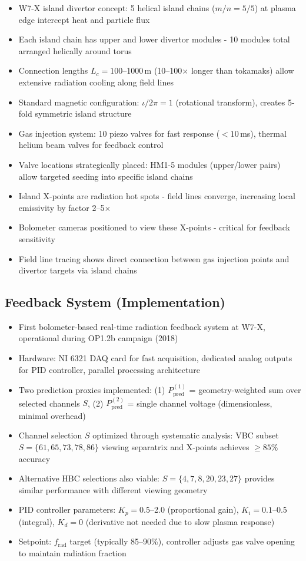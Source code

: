 \documentclass[11pt,a4paper]{article}
\begin{document}
\begin{itemize}
\item W7-X island divertor concept: 5 helical island chains ($m/n=5/5$) at plasma edge intercept heat and particle flux
\item Each island chain has upper and lower divertor modules - 10 modules total arranged helically around torus
\item Connection lengths $L_c=100$--1000\,m (10--100$\times$ longer than tokamaks) allow extensive radiation cooling along field lines
\item Standard magnetic configuration: $\iota/2\pi=1$ (rotational transform), creates 5-fold symmetric island structure
\item Gas injection system: 10 piezo valves for fast response ($<10$\,ms), thermal helium beam valves for feedback control
\item Valve locations strategically placed: HM1-5 modules (upper/lower pairs) allow targeted seeding into specific island chains
\item Island X-points are radiation hot spots - field lines converge, increasing local emissivity by factor 2--5$\times$
\item Bolometer cameras positioned to view these X-points - critical for feedback sensitivity
\item Field line tracing shows direct connection between gas injection points and divertor targets via island chains
\end{itemize}

\subsection{Feedback System (Implementation)}

\begin{itemize}
\item First bolometer-based real-time radiation feedback system at W7-X, operational during OP1.2b campaign (2018)
\item Hardware: NI 6321 DAQ card for fast acquisition, dedicated analog outputs for PID controller, parallel processing architecture
\item Two prediction proxies implemented: (1) $P_{\text{pred}}^{(1)}$ = geometry-weighted sum over selected channels $S$, (2) $P_{\text{pred}}^{(2)}$ = single channel voltage (dimensionless, minimal overhead)
\item Channel selection $S$ optimized through systematic analysis: VBC subset $S=\{61,65,73,78,86\}$ viewing separatrix and X-points achieves $\geq85\%$ accuracy
\item Alternative HBC selections also viable: $S=\{4,7,8,20,23,27\}$ provides similar performance with different viewing geometry
\item PID controller parameters: $K_p=0.5$--2.0 (proportional gain), $K_i=0.1$--0.5 (integral), $K_d=0$ (derivative not needed due to slow plasma response)
\item Setpoint: $f_{\text{rad}}$ target (typically 85--90\%), controller adjusts gas valve opening to maintain radiation fraction
\end{itemize}
\end{document}
